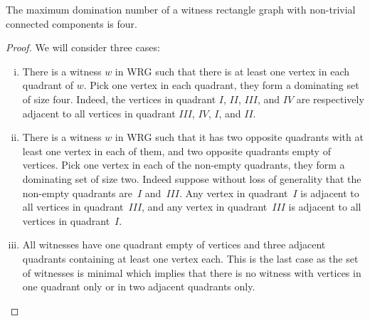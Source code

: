 \documentclass{llncs}
\begin{document}
\begin{theorem}
\label{DominationNumberWRG}
The maximum domination number of a witness rectangle graph with non-trivial connected components is four.
\end{theorem}
\begin{proof}
We will consider three cases:

\begin{enumerate}[i)]
\item There is a witness $w$ in WRG such that there is at least one vertex in each quadrant of $w$. Pick one vertex in each quadrant, they form a dominating set of size four.
Indeed, the vertices in quadrant $I$, $II$, $III$, and $IV$ are respectively adjacent to all vertices in quadrant $III$, $IV$, $I$, and $II$.

\item There is a witness $w$ in WRG such that it has two opposite quadrants with at least one vertex in each of them, and two opposite quadrants empty of vertices.
Pick one vertex in each of the non-empty quadrants, they form a dominating set of size two.
Indeed suppose without loss of generality that the non-empty quadrants are~$I$ and~$III$.
Any vertex in quadrant~$I$ is adjacent to all vertices in quadrant~$III$, and any vertex in quadrant~$III$ is adjacent to all vertices in quadrant~$I$.

\item All witnesses have one quadrant empty of vertices and three adjacent quadrants containing at least one vertex each.
This is the last case as the set of witnesses is minimal which implies that there is no witness with vertices in one quadrant only or in two adjacent quadrants only.


\end{enumerate}
\end{proof}
\end{document}

